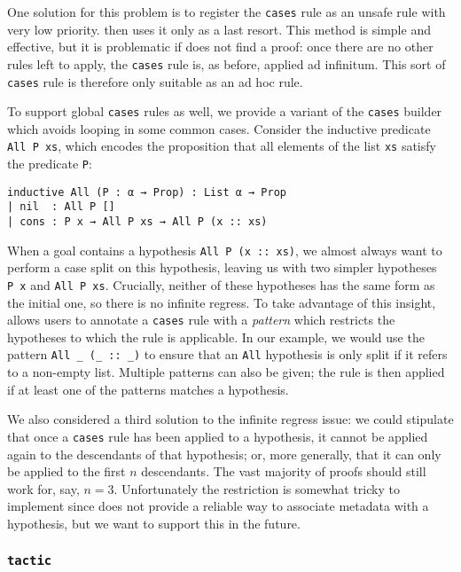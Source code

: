 One solution for this problem is to register the \texttt{cases} rule as an
unsafe rule with very low priority. \Aesop{} then uses it only as a last resort.
This method is simple and effective, but it is problematic if \Aesop{} does not
find a proof: once there are no other rules left to apply, the \texttt{cases}
rule is, as before, applied ad infinitum. This sort of \texttt{cases} rule is
therefore only suitable as an ad hoc rule.

To support global \texttt{cases} rules as well, we provide a variant of the
\texttt{cases} builder which avoids looping in some common cases. Consider the
inductive predicate \texttt{All~P~xs}, which encodes the proposition that all
elements of the list \texttt{xs} satisfy the predicate \texttt{P}:
\begin{lstlisting}
inductive All (P : α → Prop) : List α → Prop
| nil  : All P []
| cons : P x → All P xs → All P (x :: xs)
\end{lstlisting}
When a goal contains a hypothesis \texttt{All P (x~::~xs)}, we almost always
want to perform a case split on this hypothesis, leaving us with two simpler
hypotheses \texttt{P~x} and \texttt{All~P~xs}. Crucially, neither of these
hypotheses has the same form as the initial one, so there is no infinite
regress. To take advantage of this insight, \Aesop{} allows users to annotate a
\texttt{cases} rule with a \emph{pattern} which restricts the hypotheses to
which the rule is applicable. In our example, we would use the pattern
\texttt{All \_ (\_~::~\_)} to ensure that an \texttt{All} hypothesis is only
split if it refers to a non-empty list. Multiple patterns can also be given; the
rule is then applied if at least one of the patterns matches a hypothesis.

We also considered a third solution to the infinite regress issue: we could
stipulate that once a \texttt{cases} rule has been applied to a hypothesis, it
cannot be applied again to the descendants of that hypothesis; or, more
generally, that it can only be applied to the first $n$ descendants. The vast
majority of proofs should still work for, say, $n = 3$. Unfortunately the
restriction is somewhat tricky to implement since \Lean{} does not provide a
reliable way to associate metadata with a hypothesis, but we want to support
this in the future.


\subsubsection{\texttt{tactic}}

